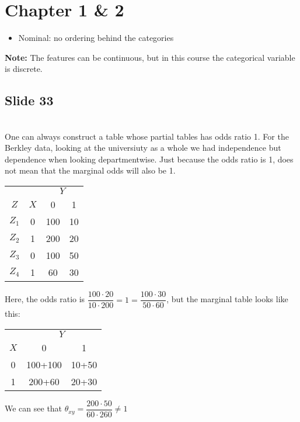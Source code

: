 \section{Chapter 1 \& 2}
\begin{itemize}
  \item Nominal: no ordering behind the categories
\end{itemize}
\par\bigskip
\noindent\textbf{Note:} The features can be continuous, but in this course the categorical variable is discrete.
\par\bigskip
\subsection{Slide 33}\hfill\\
\noindent One can always construct a table whose partial tables has odds ratio 1. For the Berkley data, looking at the universiuty as a whole we had independence but dependence when looking departmentwise. Just because the odds ratio is 1, does not mean that the marginal odds will also be 1.
\par\bigskip
\begin{center}
  \begin{tabular}{cccc}
    && \multicolumn{2}{c}{$Y$} \\
    \cmidrule{3-4}
    $Z$&$X$&0&1\\
    \midrule 
       $Z_1$&0&100&10\\
       $Z_2$&1&200&20\\
       $Z_3$&0&100&50\\
       $Z_4$&1&60&30\\
  \end{tabular}
\end{center}\par
\noindent Here, the odds ratio is $\dfrac{100\cdot20}{10\cdot200} = 1 = \dfrac{100\cdot30}{50\cdot60}$, but the marginal table looks like this:
\begin{center}
  \begin{tabular}{ccc}
    &\multicolumn{2}{c}{$Y$}\\
    \cmidrule{2-3}
    $X$&0&1\\
    \midrule
    0&100+100&10+50\\
    1&200+60&20+30
  \end{tabular}
\end{center}\par
\noindent We can see that $\theta_{xy} = \dfrac{200\cdot50}{60\cdot260}\neq1$ 
\par\bigskip
